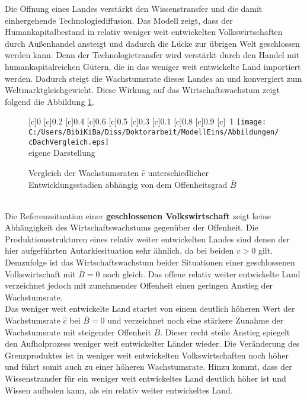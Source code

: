 Die Öffnung eines Landes verstärkt den Wissenstransfer und die damit einhergehende Technologiediffusion. Das Modell zeigt, dass der Humankapitalbestand in relativ weniger weit entwickelten Volkswirtschaften durch Au{\ss}enhandel ansteigt und dadurch die Lücke zur übrigen Welt geschlossen werden kann. Denn der Technologietransfer wird verstärkt durch den Handel mit humankapitalreichen Gütern, die in das weniger weit entwickelte Land importiert werden. Dadurch steigt die Wachstumsrate dieses Landes an und konvergiert zum Weltmarktgleichgewicht. Diese Wirkung auf das Wirtschaftswachstum zeigt folgend die Abbildung \ref{fig:cDachVergleich}.  
\begin{figure}[htb] 
\vspace{0.23cm}
 \centering 
		[c]{\footnotesize{0}}
		[c]{\footnotesize{0.2}}
		[c]{\footnotesize{0.4}}
		[c]{\footnotesize{0.6}}
		[c]{\footnotesize{0.5}}
		[c]{\footnotesize{0.3}}
		[c]{\footnotesize{0.1}}
		[c]{\footnotesize{0.8}}
		[c]{\footnotesize{0.9}}
		[c]{~\footnotesize{1}}
\texttt{[image: C:/Users/BibiKiBa/Diss/Doktorarbeit/ModellEins/Abbildungen/cDachVergleich.eps]}
\\
\hfill\footnotesize{}  eigene Darstellung
	\caption{Vergleich der Wachstumsraten $\hat{c}$ unterschiedlicher Entwicklungsstadien abhängig von dem Offenheitsgrad $\bar{B}$}
	\label{fig:cDachVergleich}
\end{figure}
\\
Die Referenzsituation einer \textbf{geschlossenen Volkswirtschaft} zeigt keine Abhängigkeit des Wirtschaftswachstums gegenüber der Offenheit. Die Produktionsstrukturen eines \textcolor[rgb]{0,0.58,0}{relativ weiter entwickelten Landes} sind denen der hier aufgeführten Autarkiesituation sehr ähnlich, da bei beiden $v>0$ gilt. Demzufolge ist das Wirtschaftswachstum beider Situationen einer geschlossenen Volkswirtschaft mit $\bar{B}=0$ noch gleich. Das offene relativ weiter entwickelte Land verzeichnet jedoch mit zunehmender Offenheit einen geringen Anstieg der Wachstumsrate.\\
Das \textcolor[rgb]{0.74,0.97,0.22}{weniger weit entwickelte Land} startet von einem deutlich höheren Wert der Wachstumsrate $\hat{c}$ bei $\bar{B}=0$ und verzeichnet noch eine stärkere Zunahme der Wachstumsrate mit steigender Offenheit $\bar{B}$. Dieser recht steile Anstieg spiegelt den Aufholprozess weniger weit entwickelter Länder wieder. Die Veränderung des Grenzproduktes ist in weniger weit entwickelten Volkswirtschaften noch höher und führt somit auch zu einer höheren Wachstumsrate. Hinzu kommt, dass der Wissenstransfer für ein weniger weit entwickeltes Land deutlich höher ist und Wissen aufholen kann, als ein relativ weiter entwickeltes Land.\\
